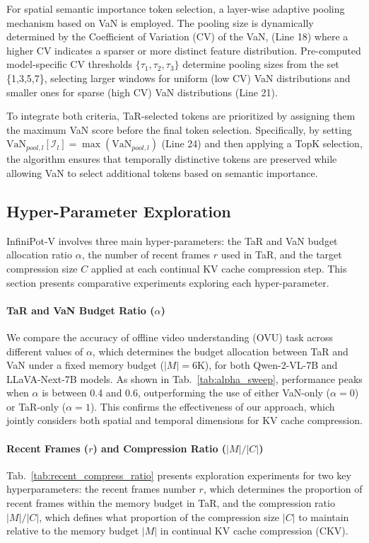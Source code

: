 For spatial semantic importance token selection, a layer-wise adaptive pooling mechanism based on VaN is employed. The pooling size is dynamically determined by the Coefficient of Variation (CV) of the VaN, (Line 18) where a higher CV indicates a sparser or more distinct feature distribution. Pre-computed model-specific CV thresholds $\{\tau_1, \tau_2, \tau_3\}$ determine pooling sizes from the set \{1,3,5,7\}, selecting larger windows for uniform (low CV) VaN distributions and smaller ones for sparse (high CV) VaN distributions (Line 21).

To integrate both criteria, TaR-selected tokens are prioritized by assigning them the maximum VaN score before the final token selection. Specifically, by setting $\text{VaN}_{pool,l}[\mathcal{I}_l] = \max(\text{VaN}_{pool,l})$ (Line 24) and then applying a TopK selection, the algorithm ensures that temporally distinctive tokens are preserved while allowing VaN to select additional tokens based on semantic importance.

\subsection{Hyper-Parameter Exploration}\label{appn:hyper_parameter} InfiniPot-V involves three main hyper-parameters: the TaR and VaN budget allocation ratio $\alpha$, the number of recent frames $r$ used in TaR, and the target compression size $C$ applied at each continual KV cache compression step. This section presents comparative experiments exploring each hyper-parameter.

\paragraph{TaR and VaN Budget Ratio ($\alpha$)} We compare the accuracy of offline video understanding (OVU) task across different values of $\alpha$, which determines the budget allocation between TaR and VaN under a fixed memory budget ($|M|=6\text{K}$), for both Qwen-2-VL-7B and LLaVA-Next-7B models. As shown in Tab.~\ref{tab:alpha_sweep}, performance peaks when $\alpha$ is between 0.4 and 0.6, outperforming the use of either VaN-only ($\alpha=0$) or TaR-only ($\alpha=1$). This confirms the effectiveness of our approach, which jointly considers both spatial and temporal dimensions for KV cache compression.

\paragraph{Recent Frames ($r$) and Compression Ratio ($|M|/|C|$)} Tab.~\ref{tab:recent_compress_ratio} presents exploration experiments for two key hyperparameters: the recent frames number $r$, which determines the proportion of recent frames within the memory budget in TaR, and the compression ratio $|M|/|C|$, which defines what proportion of the compression size $|C|$ to maintain relative to the memory budget $|M|$ in continual KV cache compression (CKV). 


